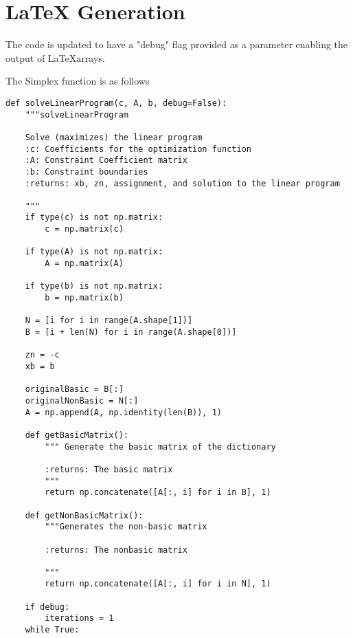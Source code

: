 \documentclass{article}
\begin{document}
\section{LaTeX Generation}

The code is updated to have a "debug" flag provided as a parameter enabling the
output of \LaTeX arrays.

The Simplex function is as follows

\begin{lstlisting}
def solveLinearProgram(c, A, b, debug=False):
    """solveLinearProgram

    Solve (maximizes) the linear program
    :c: Coefficients for the optimization function
    :A: Constraint Coefficient matrix
    :b: Constraint boundaries
    :returns: xb, zn, assignment, and solution to the linear program

    """
    if type(c) is not np.matrix:
        c = np.matrix(c)

    if type(A) is not np.matrix:
        A = np.matrix(A)

    if type(b) is not np.matrix:
        b = np.matrix(b)

    N = [i for i in range(A.shape[1])]
    B = [i + len(N) for i in range(A.shape[0])]

    zn = -c
    xb = b

    originalBasic = B[:]
    originalNonBasic = N[:]
    A = np.append(A, np.identity(len(B)), 1)

    def getBasicMatrix():
        """ Generate the basic matrix of the dictionary

        :returns: The basic matrix
        """
        return np.concatenate([A[:, i] for i in B], 1)

    def getNonBasicMatrix():
        """Generates the non-basic matrix

        :returns: The nonbasic matrix

        """
        return np.concatenate([A[:, i] for i in N], 1)

    if debug:
        iterations = 1
    while True:


\end{lstlisting}
\end{document}

